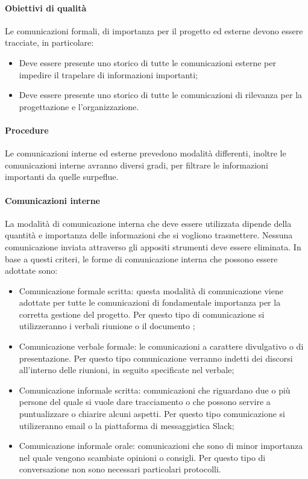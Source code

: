 \documentclass[../NormeDiProgetto_v3.0.0.tex]{subfiles}
\begin{document}
			\paragraph{Obiettivi di qualità}
				Le comunicazioni formali, di importanza per il progetto ed esterne devono essere tracciate, in particolare:
				\begin{itemize}
					\item Deve essere presente uno storico di tutte le comunicazioni esterne per impedire il trapelare di informazioni importanti;
					\item Deve essere presente uno storico di tutte le comunicazioni di rilevanza per la progettazione e l'organizzazione.
				\end{itemize}

			\paragraph{Procedure}
				Le comunicazioni interne ed esterne prevedono modalità differenti, inoltre le comunicazioni interne avranno diversi gradi, per filtrare le informazioni importanti da quelle surpeflue.
			\paragraph{Comunicazioni interne}
				La modalità di comunicazione interna che deve essere utilizzata dipende della quantità e importanza delle informazioni che si vogliono trasmettere.
				Nessuna comunicazione inviata attraverso gli appositi strumenti deve essere eliminata.
				In base a questi criteri, le forme di comunicazione interna che possono essere adottate sono:
				\begin{itemize}
					\item Comunicazione formale scritta: questa modalità di comunicazione viene adottate per tutte le comunicazioni di fondamentale importanza per la corretta gestione del progetto. Per questo tipo di comunicazione si utilizzeranno i verbali riunione o il documento \pianodiprogetto;
					\item Comunicazione verbale formale: le comunicazioni a carattere divulgativo o di presentazione. Per questo tipo comunicazione verranno indetti dei discorsi all'interno delle riunioni, in seguito specificate nel verbale;
					\item Comunicazione informale scritta: comunicazioni che riguardano due o più persone del quale si vuole dare tracciamento o che possono servire a puntualizzare o chiarire alcuni aspetti. Per questo tipo comunicazione si utilizeranno email o la piattaforma di messaggistica Slack;
					\item Comunicazione informale orale: comunicazioni che sono di minor importanza nel quale vengono scambiate opinioni o consigli. Per questo tipo di conversazione non sono necessari particolari protocolli.
				\end{itemize}
\end{document}
